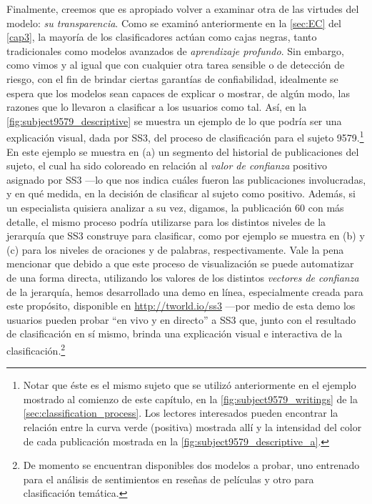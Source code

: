 Finalmente, creemos que es apropiado volver a examinar otra de las virtudes del modelo: \emph{su transparencia}.
Como se examinó anteriormente en la \autoref{sec:EC} del \autoref{cap3}, la mayoría de los clasificadores actúan como cajas negras, tanto tradicionales como modelos avanzados de \emph{aprendizaje profundo}.
Sin embargo, como vimos y al igual que con cualquier otra tarea sensible o de detección de riesgo, con el fin de brindar ciertas garantías de confiabilidad, idealmente se espera que los modelos sean capaces de explicar o mostrar, de algún modo, las razones que lo llevaron a clasificar a los usuarios como tal.
Así, en la  \autoref{fig:subject9579_descriptive} se muestra un ejemplo de lo que podría ser una explicación visual, dada por SS3, del proceso de clasificación para el sujeto 9579.\footnote{Notar que éste es el mismo sujeto que se utilizó anteriormente en el ejemplo mostrado al comienzo de este capítulo, en la \autoref{fig:subject9579_writings} de la \autoref{sec:classification_process}. Los lectores interesados pueden encontrar la relación entre la curva verde (positiva) mostrada allí y la intensidad del color de cada publicación mostrada en la \autoref{fig:subject9579_descriptive_a}.}
En este ejemplo se muestra en (a) un segmento del historial de publicaciones del sujeto, el cual ha sido coloreado en relación al \emph{valor de confianza} positivo asignado por SS3 ---lo que nos indica cuáles fueron las publicaciones involucradas, y en qué medida, en la decisión de clasificar al sujeto como positivo. Además, si un especialista quisiera analizar a su vez, digamos, la publicación 60 con más detalle, el mismo proceso podría utilizarse para los distintos niveles de la jerarquía que SS3 construye para clasificar, como por ejemplo se muestra en (b) y (c) para los niveles de oraciones y de palabras, respectivamente.
Vale la pena mencionar que debido a que este proceso de visualización se puede automatizar de una forma directa, utilizando los valores de los distintos \emph{vectores de confianza} de la jerarquía, hemos desarrollado una demo en línea, especialmente creada para este propósito, disponible en \url{http://tworld.io/ss3} ---por medio de esta demo los usuarios pueden probar ``en vivo y en directo'' a SS3 que, junto con el resultado de clasificación en sí mismo, brinda una explicación visual e interactiva de la clasificación.\footnote{De momento se encuentran disponibles dos modelos a probar, uno entrenado para el análisis de sentimientos en reseñas de películas y otro para clasificación temática.}
